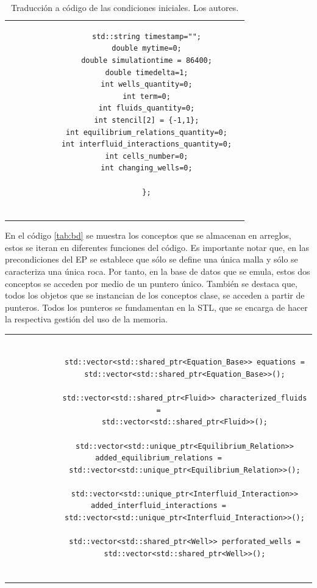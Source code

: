 \begin{appendix}
\begin{table}[h]
\begin{tabular}{cc}
\begin{tiny}
\begin{lstlisting}
			std::string timestamp="";
			double mytime=0;
			double simulationtime = 86400;
			double timedelta=1;
			int wells_quantity=0;
			int term=0;
			int fluids_quantity=0;
			int stencil[2] = {-1,1};
			int equilibrium_relations_quantity=0;
			int interfluid_interactions_quantity=0;
			int cells_number=0;
			int changing_wells=0;
			
			};
			
			\end{lstlisting}
		\end{tiny}
	\end{tabular}
	\label{tab:InitialConditions}
	\caption[Traducción a código de las condiciones iniciales.]{Traducción a código de las condiciones iniciales. Los autores.}
\end{table}

En el código \ref{tab:bd} se muestra los conceptos que se almacenan en arreglos, estos se iteran en diferentes funciones del código. Es importante notar que, en las precondiciones del EP se establece que sólo se define una única malla y sólo se caracteriza una única roca. Por tanto, en la base de datos que se emula, estos dos conceptos se acceden por medio de un puntero único. También se destaca que, todos los objetos que se instancian de los conceptos clase, se acceden a partir de punteros. Todos los punteros se fundamentan en la STL, que se encarga de hacer la respectiva gestión del uso de la memoria.\\

\begin{table}
	\begin{tabular}{c}
		\begin{tiny}
			\begin{lstlisting}
			
			std::vector<std::shared_ptr<Equation_Base>> equations =
			std::vector<std::shared_ptr<Equation_Base>>();
			
			std::vector<std::shared_ptr<Fluid>> characterized_fluids =
			std::vector<std::shared_ptr<Fluid>>();
			
			std::vector<std::unique_ptr<Equilibrium_Relation>> added_equilibrium_relations =
			std::vector<std::unique_ptr<Equilibrium_Relation>>();
			
			std::vector<std::unique_ptr<Interfluid_Interaction>> added_interfluid_interactions =
			std::vector<std::unique_ptr<Interfluid_Interaction>>();
			
			std::vector<std::shared_ptr<Well>> perforated_wells =
			std::vector<std::shared_ptr<Well>>();
			

\end{lstlisting}
\end{tiny}
\end{tabular}
\end{table}
\end{appendix}

